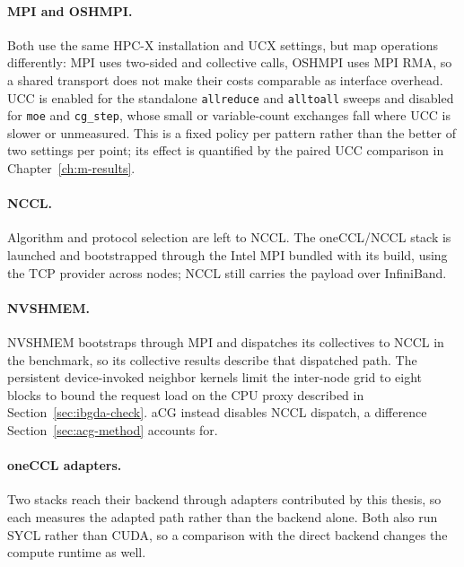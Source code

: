 \paragraph{MPI and OSHMPI.} Both use the same HPC-X installation and UCX settings, but map operations differently: MPI uses two-sided and collective calls, OSHMPI uses MPI RMA, so a shared transport does not make their costs comparable as interface overhead. UCC is enabled for the standalone \texttt{allreduce} and \texttt{alltoall} sweeps and disabled for \texttt{moe} and \texttt{cg\_step}, whose small or variable-count exchanges fall where UCC is slower or unmeasured. This is a fixed policy per pattern rather than the better of two settings per point; its effect is quantified by the paired UCC comparison in Chapter~\ref{ch:m-results}.

\paragraph{NCCL.} Algorithm and protocol selection are left to NCCL. The oneCCL/NCCL stack is launched and bootstrapped through the Intel MPI bundled with its build, using the TCP provider across nodes; NCCL still carries the payload over InfiniBand.

\paragraph{NVSHMEM.} NVSHMEM bootstraps through MPI and dispatches its collectives to NCCL in the benchmark, so its collective results describe that dispatched path. The persistent device-invoked neighbor kernels limit the inter-node grid to eight blocks to bound the request load on the CPU proxy described in Section~\ref{sec:ibgda-check}. aCG instead disables NCCL dispatch, a difference Section~\ref{sec:acg-method} accounts for.

\paragraph{oneCCL adapters.}\label{sec:oneccl-method} Two stacks reach their backend through adapters contributed by this thesis, so each measures the adapted path rather than the backend alone. Both also run SYCL rather than CUDA, so a comparison with the direct backend changes the compute runtime as well.

